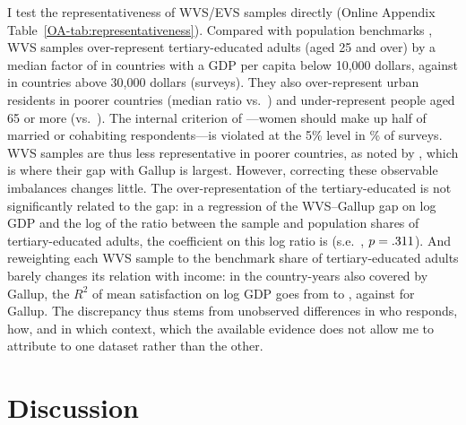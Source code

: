 \documentclass[12pt]{article}
\begin{document}
I test the representativeness of WVS/EVS samples directly (Online Appendix Table~\ref{OA-tab:representativeness}). Compared with population benchmarks \citep{barro_new_2013,worldbank_wdi_2026}, WVS samples over-represent tertiary-educated adults (aged 25 and over) by a median factor of \ratioTertiaryLow in countries with a GDP per capita below 10,000 dollars, against \ratioTertiaryHigh in countries above 30,000 dollars (\nCompositionSurveys surveys). They also over-represent urban residents in poorer countries (median ratio \ratioUrbanLow vs.\ \ratioUrbanHigh) and under-represent people aged 65 or more (\ratioOldLow vs.\ \ratioOldHigh). The internal criterion of \citet{kohler_surveys_2007}---women should make up half of married or cohabiting respondents---is violated at the 5\% level in \shareGenderFlag\% of surveys. WVS samples are thus less representative in poorer countries, as noted by \citet{deaton_income_2008}, which is where their gap with Gallup is largest. However, correcting these observable imbalances changes little. The over-representation of the tertiary-educated is not significantly related to the gap: in a regression of the WVS--Gallup gap on log GDP and the log of the ratio between the sample and population shares of tertiary-educated adults, the coefficient on this log ratio is \coefTertiaryGap (s.e.\ \seTertiaryGap, $p = .311$). And reweighting each WVS sample to the benchmark share of tertiary-educated adults barely changes its relation with income: in the country-years also covered by Gallup, the $R^2$ of mean satisfaction on log GDP goes from \RtwoCommonWVSraw to \RtwoCommonWVSeduAdj, against \RtwoCommonGallupSub for Gallup. The discrepancy thus stems from unobserved differences in who responds, how, and in which context, which the available evidence does not allow me to attribute to one dataset rather than the other.


\section{Discussion}\label{sec:discussion} %
\end{document}
